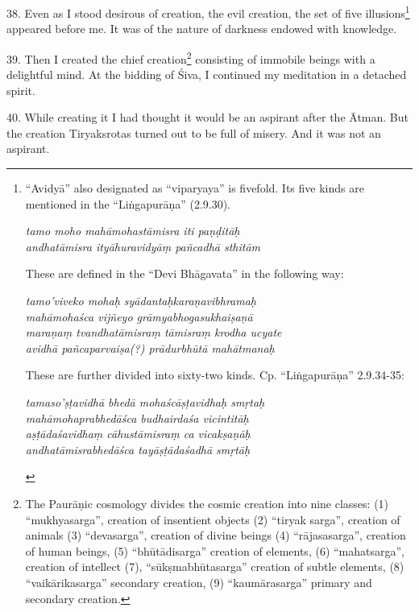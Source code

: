 38. Even as I stood desirous of creation, the evil creation, \viz the set of
five illusions\footnote{“Avidyā” also designated as “viparyaya” is fivefold. Its
five kinds are mentioned in the “Liṅgapurāṇa” (2.9.30).

\begin{shloka}\itshape
tamo moho mahāmohastāmisra iti paṇḍitāḥ\\
andhatāmisra ityāhuravidyāṃ pañcadhā sthitām
\end{shloka}

These are defined in the “Devi Bhāgavata” in the following way:

\begin{shloka}\itshape
tamo'viveko mohaḥ syādantaḥkaraṇavibhramaḥ\\
mahāmohaśca vijñeyo grāmyabhogasukhaiṣaṇā\\
maraṇaṃ tvandhatāmisraṃ tāmisraṃ krodha ucyate\\
avidhā pañcaparvaiṣa(?) prādurbhūtā mahātmanaḥ
\end{shloka}

These are further divided into sixty-two kinds. Cp. “Liṅgapurāṇa” 2.9.34-35:

\begin{shloka}\itshape
tamaso'ṣṭavidhā bhedā mohaścāṣṭavidhaḥ smṛtaḥ\\
mahāmohaprabhedāśca budhairdaśa vicintitāḥ\\
aṣṭādaśavidhaṃ cāhustāmisraṃ ca vicakṣaṇāḥ\\
andhatāmisrabhedāśca tayāṣṭādaśadhā smṛtāḥ
\end{shloka}} appeared before me. It was of the nature of darkness endowed with
knowledge.

39. Then I created the chief creation\footnote{The Paurāṇic cosmology divides
the cosmic creation into nine classes: \viz (1) “mukhyasarga”, creation of
insentient objects (2) “tiryak sarga”, creation of animals (3) “devasarga”,
creation of divine beings (4) “rājasasarga”, creation of human beings, (5)
“bhūtādisarga” creation of elements, (6) “mahatsarga”, creation of intellect (7),
“sūkṣmabhūtasarga” creation of subtle elements, (8) “vaikārikasarga” secondary
creation, (9) “kaumārasarga” primary and secondary creation.} consisting of
immobile beings with a delightful mind. At the bidding of Śiva, I continued my
meditation in a detached spirit.

40. While creating it I had thought it would be an aspirant after the Ātman. But
the creation Tiryaksrotas turned out to be full of misery. And it was not an
aspirant.

